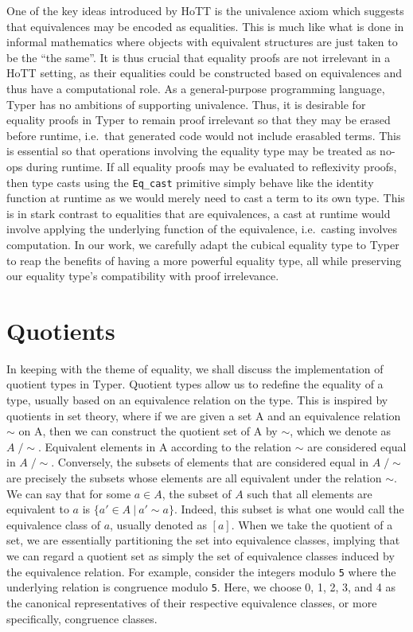 \documentclass[12pt,twoside,maitrise]{dms}
\theoremstyle{definition}
\numberwithin{equation}{section}
\numberwithin{table}{chapter}
\numberwithin{figure}{chapter}
\newcommand\id[1] {\texttt{#1}}
\newcommand\fn[1] {\texttt{#1}}
\begin{document}
One of the key ideas introduced by HoTT is the univalence axiom which suggests
that equivalences may be encoded as equalities. This is much like what is done
in informal mathematics where objects with equivalent structures are just taken
to be the ``the same''. It is thus crucial that equality proofs are not
irrelevant in a HoTT setting, as their equalities could be constructed based on
equivalences and thus have a computational role. As a general-purpose
programming language, Typer has no ambitions of supporting univalence. Thus, it
is desirable for equality proofs in Typer to remain proof irrelevant so that
they may be erased before runtime, i.e.\ that generated code would not include
erasabled terms. This is essential so that operations involving the equality
type may be treated as no-ops during runtime. If all equality proofs may be
evaluated to reflexivity proofs, then type casts using the \fn{Eq\_cast}
primitive simply behave like the identity function at runtime as we would merely
need to cast a term to its own type. This is in stark contrast to equalities
that are equivalences, a cast at runtime would involve applying the underlying
function of the equivalence, i.e.\ casting involves computation. In our work, we
carefully adapt the cubical equality type to Typer to reap the benefits of
having a more powerful equality type, all while preserving our equality type's
compatibility with proof irrelevance.

\section{Quotients}

In keeping with the theme of equality, we shall discuss the implementation of
quotient types in Typer. Quotient types allow us to redefine the equality of a
type, usually based on an equivalence relation on the type. This is inspired by
quotients in set theory, where if we are given a set A and an equivalence
relation $\sim$ on A, then we can construct the quotient set of A by $\sim$,
which we denote as $A\; / \sim$. Equivalent elements in A according to the
relation $\sim$ are considered equal in $A\; / \sim$. Conversely, the subsets of
elements that are considered equal in $A\; / \sim$ are precisely the subsets
whose elements are all equivalent under the relation $\sim$. We can say that for
some $a \in A$, the subset of $A$ such that all elements are equivalent to $a$
is $\{a' \in A \ | \ a' \sim a \}$. Indeed, this subset is what one would call
the equivalence class of $a$, usually denoted as $[a]$. When we take the
quotient of a set, we are essentially partitioning the set into equivalence
classes, implying that we can regard a quotient set as simply the set of
equivalence classes induced by the equivalence relation. For example, consider
the integers modulo \id{5} where the underlying relation is congruence modulo
\id{5}. Here, we choose 0, 1, 2, 3, and 4 as the canonical representatives of
their respective equivalence classes, or more specifically, congruence classes.
\end{document}
